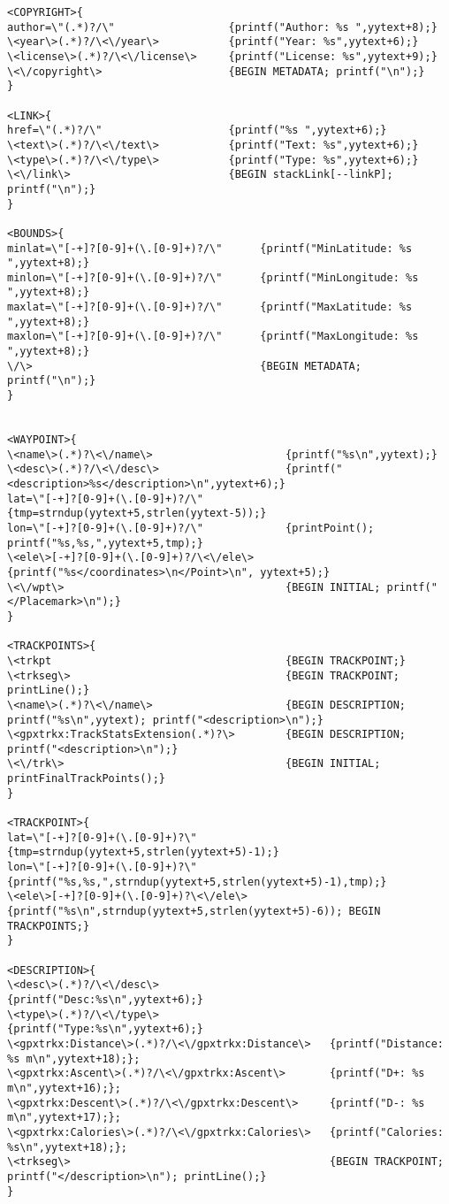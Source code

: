 \documentclass{llncs}
\begin{document}
\begin{changemargin}{-4cm}{0cm}
\begin{verbatim}
<COPYRIGHT>{
author=\"(.*)?/\"                  {printf("Author: %s ",yytext+8);}
\<year\>(.*)?/\<\/year\>           {printf("Year: %s",yytext+6);}
\<license\>(.*)?/\<\/license\>     {printf("License: %s",yytext+9);}
\<\/copyright\>                    {BEGIN METADATA; printf("\n");}
}

<LINK>{
href=\"(.*)?/\"                    {printf("%s ",yytext+6);}
\<text\>(.*)?/\<\/text\>           {printf("Text: %s",yytext+6);}
\<type\>(.*)?/\<\/type\>           {printf("Type: %s",yytext+6);}
\<\/link\>                         {BEGIN stackLink[--linkP]; printf("\n");}
}

<BOUNDS>{
minlat=\"[-+]?[0-9]+(\.[0-9]+)?/\"      {printf("MinLatitude: %s ",yytext+8);}
minlon=\"[-+]?[0-9]+(\.[0-9]+)?/\"      {printf("MinLongitude: %s ",yytext+8);}
maxlat=\"[-+]?[0-9]+(\.[0-9]+)?/\"      {printf("MaxLatitude: %s ",yytext+8);}
maxlon=\"[-+]?[0-9]+(\.[0-9]+)?/\"      {printf("MaxLongitude: %s ",yytext+8);}
\/\>                                    {BEGIN METADATA; printf("\n");}
}


<WAYPOINT>{
\<name\>(.*)?\<\/name\>                     {printf("%s\n",yytext);}
\<desc\>(.*)?/\<\/desc\>                    {printf("<description>%s</description>\n",yytext+6);}
lat=\"[-+]?[0-9]+(\.[0-9]+)?/\"             {tmp=strndup(yytext+5,strlen(yytext-5));}
lon=\"[-+]?[0-9]+(\.[0-9]+)?/\"             {printPoint(); printf("%s,%s,",yytext+5,tmp);}
\<ele\>[-+]?[0-9]+(\.[0-9]+)?/\<\/ele\>     {printf("%s</coordinates>\n</Point>\n", yytext+5);}
\<\/wpt\>                                   {BEGIN INITIAL; printf("</Placemark>\n");}
}

<TRACKPOINTS>{
\<trkpt                                     {BEGIN TRACKPOINT;}
\<trkseg\>                                  {BEGIN TRACKPOINT; printLine();}
\<name\>(.*)?\<\/name\>                     {BEGIN DESCRIPTION; printf("%s\n",yytext); printf("<description>\n");} 
\<gpxtrkx:TrackStatsExtension(.*)?\>        {BEGIN DESCRIPTION; printf("<description>\n");}
\<\/trk\>                                   {BEGIN INITIAL; printFinalTrackPoints();}
}

<TRACKPOINT>{
lat=\"[-+]?[0-9]+(\.[0-9]+)?\"              {tmp=strndup(yytext+5,strlen(yytext+5)-1);}
lon=\"[-+]?[0-9]+(\.[0-9]+)?\"              {printf("%s,%s,",strndup(yytext+5,strlen(yytext+5)-1),tmp);}
\<ele\>[-+]?[0-9]+(\.[0-9]+)?\<\/ele\>      {printf("%s\n",strndup(yytext+5,strlen(yytext+5)-6)); BEGIN TRACKPOINTS;}
}

<DESCRIPTION>{
\<desc\>(.*)?/\<\/desc\>                           {printf("Desc:%s\n",yytext+6);}
\<type\>(.*)?/\<\/type\>                           {printf("Type:%s\n",yytext+6);}
\<gpxtrkx:Distance\>(.*)?/\<\/gpxtrkx:Distance\>   {printf("Distance: %s m\n",yytext+18);};
\<gpxtrkx:Ascent\>(.*)?/\<\/gpxtrkx:Ascent\>       {printf("D+: %s m\n",yytext+16);};
\<gpxtrkx:Descent\>(.*)?/\<\/gpxtrkx:Descent\>     {printf("D-: %s m\n",yytext+17);};
\<gpxtrkx:Calories\>(.*)?/\<\/gpxtrkx:Calories\>   {printf("Calories: %s\n",yytext+18);};
\<trkseg\>                                         {BEGIN TRACKPOINT; printf("</description>\n"); printLine();}
}


\end{verbatim}
\end{changemargin}
\end{document}
